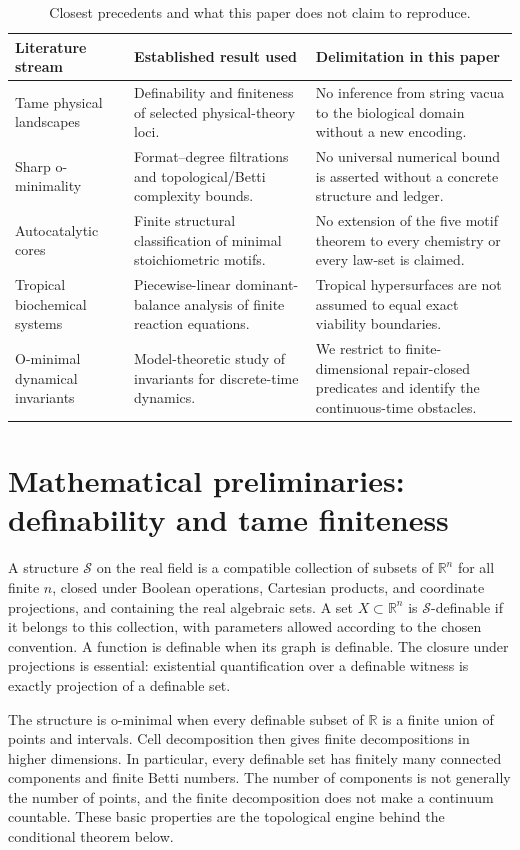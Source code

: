 \documentclass[11pt,a4paper]{article}
\theoremstyle{definition}
\theoremstyle{remark}
\newcommand{\R}{\mathbb{R}}
\newcommand{\cS}{\mathcal{S}}
\begin{document}
\begin{table}[H]
\centering\small
\caption{Closest precedents and what this paper does not claim to reproduce.}
\begin{tabularx}{\textwidth}{@{}p{}p{}X@{}}
\toprule
Literature stream & Established result used & Delimitation in this paper \\
\midrule
Tame physical landscapes & Definability and finiteness of selected physical-theory loci. & No inference from string vacua to the biological domain without a new encoding.\\
Sharp o-minimality & Format--degree filtrations and topological/Betti complexity bounds. & No universal numerical bound is asserted without a concrete structure and ledger.\\
Autocatalytic cores & Finite structural classification of minimal stoichiometric motifs. & No extension of the five motif theorem to every chemistry or every law-set is claimed.\\
Tropical biochemical systems & Piecewise-linear dominant-balance analysis of finite reaction equations. & Tropical hypersurfaces are not assumed to equal exact viability boundaries.\\
O-minimal dynamical invariants & Model-theoretic study of invariants for discrete-time dynamics. & We restrict to finite-dimensional repair-closed predicates and identify the continuous-time obstacles.\\
\bottomrule
\end{tabularx}
\end{table}

\section{Mathematical preliminaries: definability and tame finiteness}
A structure \(\cS\) on the real field is a compatible collection of subsets of \(\R^n\) for all finite \(n\), closed under Boolean operations, Cartesian products, and coordinate projections, and containing the real algebraic sets. A set \(X\subset\R^n\) is \(\cS\)-definable if it belongs to this collection, with parameters allowed according to the chosen convention. A function is definable when its graph is definable. The closure under projections is essential: existential quantification over a definable witness is exactly projection of a definable set.

The structure is o-minimal when every definable subset of \(\R\) is a finite union of points and intervals. Cell decomposition then gives finite decompositions in higher dimensions. In particular, every definable set has finitely many connected components and finite Betti numbers. The number of components is not generally the number of points, and the finite decomposition does not make a continuum countable. These basic properties are the topological engine behind the conditional theorem below.
\end{document}

